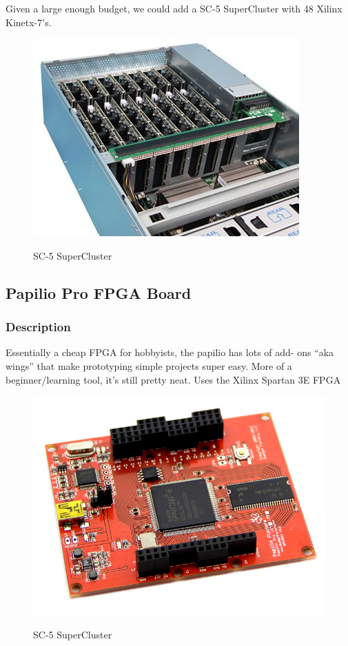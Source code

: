 \documentclass[12pt]{article}
\begin{document}
Given a large enough budget, we could add a SC-5 SuperCluster with 48 Xilinx Kinetx-7's.

\begin{figure}[h!]
  \centering
  \includegraphics[scale=.5]{images/superCluster}
  \label{img:pico}
  \caption{SC-5 SuperCluster}
\end{figure}

\subsection{Papilio Pro FPGA Board}

\subsubsection{Description}
Essentially a cheap FPGA for hobbyists, the papilio has lots of add-
ons “aka wings” that make prototyping simple projects super easy. More of a
beginner/learning tool, it’s still pretty neat. Uses the Xilinx Spartan 3E FPGA

\begin{figure}[h!]
  \centering
  \includegraphics[scale=.5]{images/papilio}
  \label{img:pico}
  \caption{SC-5 SuperCluster}
\end{figure}
\end{document}
